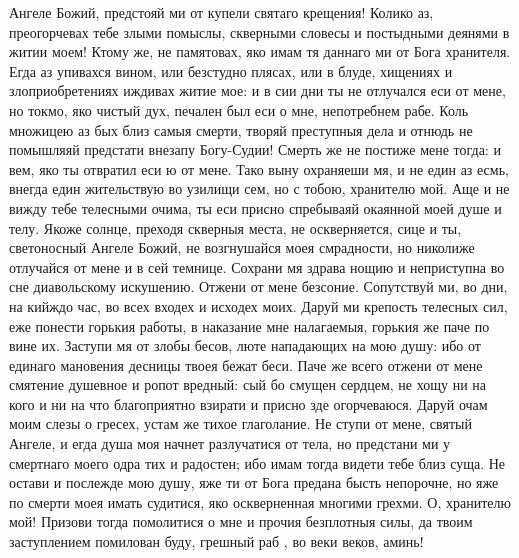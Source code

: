 \begin{mymulticols}


Ангеле Божий, предстояй ми от купели святаго крещения! Колико аз, преогорчевах тебе злыми помыслы, скверными словесы и постыдными деянями в житии моем! Ктому же, не памятовах, яко имам тя даннаго ми от Бога хранителя. Егда аз упивахся вином, или безстудно плясах, или в блуде, хищениях и злоприобретениях иждивах житие мое: и в сии дни ты не отлучался еси от мене, но токмо, яко чистый дух, печален был еси о мне, непотребнем рабе. Коль множицею аз бых близ самыя смерти, творяй преступныя дела и отнюдь не помышляяй предстати внезапу Богу-Судии! Смерть же не постиже мене тогда: и вем, яко ты отвратил еси ю от мене. Тако выну охраняеши мя, и не един аз есмь, внегда един жительствую во узилищи сем, но с тобою, хранителю мой. Аще и не вижду тебе телесными очима, ты еси присно спребываяй окаянной моей душе и телу. Якоже солнце, преходя скверныя места, не оскверняется, сице и ты, светоносный Ангеле Божий, не возгнушайся моея смрадности, но николиже отлучайся от мене и в сей темнице. Сохрани мя здрава нощию и неприступна во сне диавольскому искушению. Отжени от мене безсоние. Сопутствуй ми, во дни, на кийждо час, во всех входех и исходех моих. Даруй ми крепость телесных сил, еже понести горькия работы, в наказание мне налагаемыя, горькия же паче по вине их. Заступи мя от злобы бесов, люте нападающих на мою душу: ибо от единаго мановения десницы твоея бежат беси. Паче же всего отжени от мене смятение душевное и ропот вредный: сый бо смущен сердцем, не хощу ни на кого и ни на что благоприятно взирати и присно зде огорчеваюся. Даруй очам моим слезы о гресех, устам же тихое глаголание. Не ступи от мене, святый Ангеле, и егда душа моя начнет разлучатися от тела, но предстани ми у смертнаго моего одра тих и радостен; ибо имам тогда видети тебе близ суща. Не остави и послежде мою душу, яже ти от Бога предана бысть непорочне, но яже по смерти моея имать судитися, яко оскверненная многими грехми. О, хранителю мой! Призови тогда помолитися о мне и прочия безплотныя силы, да твоим заступлением помилован буду, грешный раб , во веки веков, аминь! 

\end{mymulticols}

\mychapterending

